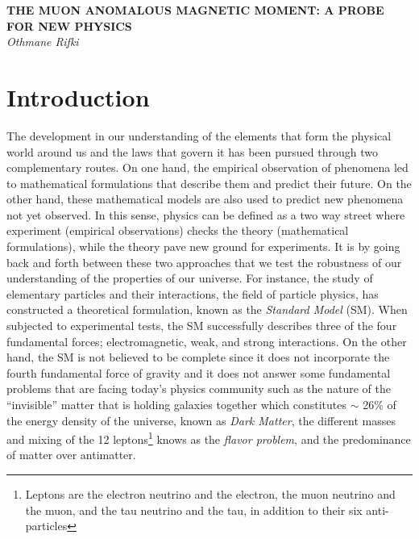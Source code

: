 \documentclass{outhesis}
\begin{document}

%  



\begin{titlepage}
   \begin{center}
      \Large\textbf{THE MUON ANOMALOUS MAGNETIC MOMENT: A PROBE FOR NEW PHYSICS}\\
      \large\textit{Othmane Rifki}
   \end{center}
\end{titlepage}

\section{Introduction}


The development in our understanding of the elements that form the physical world around us and the laws that govern it has been pursued through two complementary routes. On one hand, the empirical observation of phenomena led to mathematical formulations that describe them and predict their future. On the other hand, these mathematical models are also used to predict new phenomena not yet observed. In this sense, physics can be defined as a two way street where experiment (empirical observations) checks the theory (mathematical formulations), while the theory pave new ground for experiments. It is by going back and forth between these two approaches that we test the robustness of our understanding of the properties of our universe. For instance, the study of elementary particles and their interactions, the field of particle physics, has constructed a theoretical formulation, known as the \emph{Standard Model} (SM). When subjected to experimental tests, the SM successfully describes three of the four fundamental forces; electromagnetic, weak, and strong interactions. On the other hand, the SM is not believed to be complete since it does not incorporate the fourth fundamental force of gravity and it does not answer 
some fundamental problems that are facing today's physics community such as the nature of the ``invisible'' matter that is holding galaxies together which constitutes $\sim$ 26\% of the energy density of the universe, known as \emph{Dark Matter}, the different masses and mixing of the 12 leptons\footnote{Leptons are the electron neutrino and the electron, the muon neutrino and the muon, and the tau neutrino and the tau, in addition to their six anti-particles } knows as the \emph{flavor problem}, and the predominance of matter over antimatter. 
 
\end{document}
